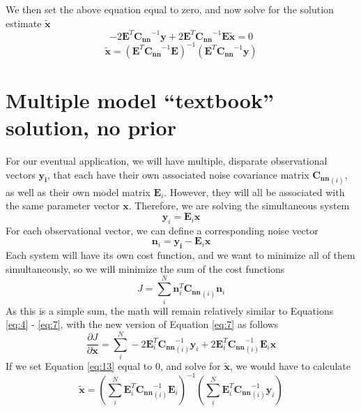 \documentclass{article}
\begin{document}
We then set the above equation equal to zero, and now solve for the solution estimate $\mathbf{\tilde{x}}$
\begin{equation}
  \label{eq:8}
 -2 \mathbf{E}^T\mathbf{C_{nn}}^{-1}\mathbf{y} + 2 \mathbf{E}^T\mathbf{C_{nn}}^{-1}\mathbf{E\tilde{x}}= 0 
\end{equation}
\begin{equation}
\label{eq:9}
\mathbf{\tilde{x}} = (\mathbf{E}^{T}\mathbf{C_{nn}}^{-1}\mathbf{E})^{-1}(\mathbf{E}^T\mathbf{C_{nn}}^{-1}\mathbf{y})
\end{equation}

\section{Multiple model ``textbook'' solution, no prior}
For our eventual application, we will have multiple, disparate observational vectors $\mathbf{y_{i}}$, that each have their own associated noise covariance matrix $\mathbf{C_{nn}}_{(i)}$, as well as their own model matrix $\mathbf{E}_i$. However, they will all be associated with the same parameter vector $\mathbf{x}$. Therefore, we are solving the simultaneous system
\begin{equation}
\label{eq:10}
\mathbf{y}_{i} = \mathbf{E}_{i}\mathbf{x}
\end{equation}
For each observational vector, we can define a corresponding noise vector
\begin{equation}
\label{eq:11}
\mathbf{n}_{i} = \mathbf{y_{i}} - \mathbf{E}_i\mathbf{x}
\end{equation}
Each system will have its own cost function, and we want to minimize all of them simultaneously, so we will minimize the sum of the cost functions
\begin{equation}
\label{eq:12}
J = \sum^{N}_{i} \mathbf{n}_{i}^T\mathbf{C_{nn}}_{(i)}\mathbf{n}_{i}
\end{equation}
As this is a simple sum, the math will remain relatively similar to Equations \ref{eq:4} - \ref{eq:7}, with the new version of Equation \ref{eq:7} as follows
\begin{equation}
\label{eq:13}
\frac{\partial J}{\partial \mathbf{x}} = \sum_{i}^{N} -2 \mathbf{E}_{i}^{T} \mathbf{C_{nn}}^{-1}_{(i)}\mathbf{y}_{i} + 2 \mathbf{E}^{T}_{i}\mathbf{C_{nn}}^{-1}_{(i)}\mathbf{E}_i\mathbf{x}
\end{equation}
If we set Equation \ref{eq:13} equal to 0, and solve for $\mathbf{\tilde{x}}$, we would have to calculate
\begin{equation}
\label{eq:14}
\mathbf{\tilde{x}} = \left(\sum_{i}^{N}\mathbf{E}^{T}_{i}\mathbf{C_{nn}}^{-1}_{(i)}\mathbf{E}_i\right)^{-1} \left(\sum_{i}^{N} \mathbf{E}_{i}^{T} \mathbf{C_{nn}}^{-1}_{(i)}\mathbf{y}_{i}\right)
\end{equation}
\end{document}

